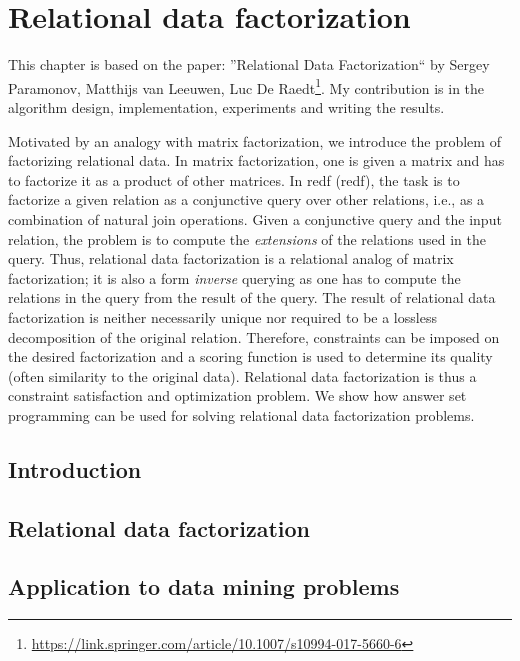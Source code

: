 \chapter{Relational data factorization}\label{ch:ReDF}
This chapter is based on the paper: ''Relational Data Factorization`` by Sergey Paramonov, Matthijs van Leeuwen, Luc De Raedt\footnote{\url{https://link.springer.com/article/10.1007/s10994-017-5660-6}}. My contribution is in the algorithm design, implementation, experiments and writing the results.


\newcommand{\redfpath}{chapters/ReDF/tex_files}


Motivated by an analogy with matrix factorization, we introduce the problem of factorizing relational data. In matrix factorization, one is given a matrix and has to factorize it as a product of other matrices. In \acrlong{redf} (\acrshort{redf}), the task is to factorize a given relation as a conjunctive query over other relations, i.e., as a combination of natural join operations. Given a conjunctive query and the input relation, the problem is to compute the \emph{extensions} of the relations used in the query. Thus, relational data factorization is a relational analog of matrix factorization; it is also a form {\em inverse} querying as one has to compute the relations in the query from the result of the query.  The result of relational data factorization is neither necessarily unique nor required to be a lossless decomposition of the original relation. Therefore, constraints can be imposed on the desired factorization and a scoring function is used to determine its quality (often similarity to the original data). Relational data factorization is thus a constraint satisfaction and optimization problem. We show how answer set programming can be used for solving relational data factorization problems. 


\section{Introduction}
 
\section{Relational data factorization}
\label{section:framework}


\section{Application to data mining problems}
\label{section:dm_problems}

